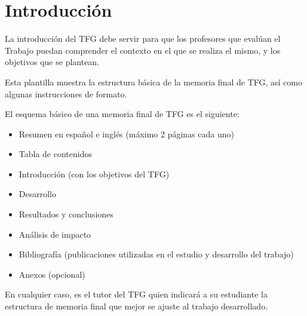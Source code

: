 \chapter{Introducción}
\label{ch:intro}

La introducción del TFG debe servir para que los profesores que evalúan el Trabajo puedan comprender el contexto en el que se realiza el mismo, y los objetivos que se plantean.

Esta plantilla muestra la estructura básica de la memoria final de TFG, así como algunas instrucciones de formato.

El esquema básico de una memoria final de TFG es el siguiente:
\begin{itemize}
\item Resumen en español e inglés (máximo 2 páginas cada uno)
\item Tabla de contenidos
\item Introducción (con los objetivos del TFG)
\item Desarrollo
\item Resultados y conclusiones
\item Análisis de impacto
\item Bibliografía (publicaciones utilizadas en el estudio y desarrollo del trabajo)
\item Anexos (opcional)
\end{itemize}

En cualquier caso, es el tutor del TFG quien indicará a su estudiante la estructura de memoria final que mejor se ajuste al trabajo desarrollado.

